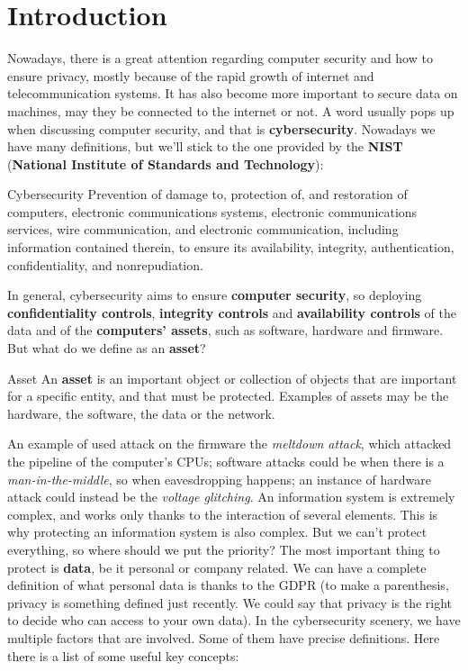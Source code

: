 \chapter{Introduction} 

Nowadays, there is a great attention regarding computer security and how to ensure privacy, mostly because of the rapid growth of internet and telecommunication systems. It has also become more important to secure data on machines, may they be connected to the internet or not. A word usually pops up when discussing computer security, and that is \textbf{cybersecurity}. Nowadays we have many definitions, but we'll stick to the one provided by the \textbf{NIST} (\textbf{National Institute of Standards and Technology}):

\begin{definition}{Cybersecurity}
    Prevention of damage to, protection of, and restoration of computers, electronic communications systems, electronic communications services, wire communication, and electronic communication, including information contained therein, to ensure its availability, integrity, authentication, confidentiality, and nonrepudiation.
\end{definition}

In general, cybersecurity aims to ensure \textbf{computer security}, so deploying \textbf{confidentiality controls}, \textbf{integrity controls} and \textbf{availability controls} of the data and of the \textbf{computers' assets}, such as software, hardware and firmware. But what do we define as an \textbf{asset}?

\begin{definition}{Asset}
    An \textbf{asset} is an important object or collection of objects that are important for a specific entity, and that must be protected. Examples of assets may be the hardware, the software, the data or the network.
\end{definition}

An example of used attack on the firmware the \textit{meltdown attack}, which attacked the pipeline of the computer's CPUs; software attacks could be when there is a \textit{man-in-the-middle}, so when eavesdropping happens; an instance of hardware attack could instead be the \textit{voltage glitching}.
\nwl
An information system is extremely complex, and works only thanks to the interaction of several elements. This is why protecting an information system is also complex. But we can't protect everything, so where should we put the priority?
\nwl
The most important thing to protect is \textbf{data}, be it personal or company related. We can have a complete definition of what personal data is thanks to the GDPR (to make a parenthesis, privacy is something defined just recently. We could say that privacy is the right to decide who can access to your own data).
\nwl
In the cybersecurity scenery, we have multiple factors that are involved. Some of them have precise definitions. Here there is a list of some useful key concepts:

